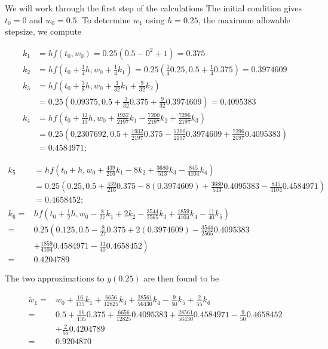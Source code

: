 \begin{mysolution}
We will work through the first step of the calculations
The initial condition gives $t_{0}=0$ and $w_{0}=0.5$. To determine $w_{1}$ using $h=0.25$, the maximum allowable stepsize, we compute

$$
\begin{aligned}
k_{1} & =h f\left(t_{0}, w_{0}\right)=0.25\left(0.5-0^{2}+1\right)=0.375 \\
k_{2} & =h f\left(t_{0}+\frac{1}{4} h, w_{0}+\frac{1}{4} k_{1}\right)=0.25\left(\frac{1}{4} 0.25,0.5+\frac{1}{4} 0.375\right)=0.3974609 \\
k_{3} & =h f\left(t_{0}+\frac{3}{8} h, w_{0}+\frac{3}{32} k_{1}+\frac{9}{32} k_{2}\right) \\
& =0.25\left(0.09375,0.5+\frac{3}{32} 0.375+\frac{9}{32} 0.3974609\right)=0.4095383 \\
k_{4} & =h f\left(t_{0}+\frac{12}{13} h, w_{0}+\frac{1932}{2197} k_{1}-\frac{7200}{2197} k_{2}+\frac{7296}{2197} k_{3}\right) \\
& =0.25\left(0.2307692,0.5+\frac{1932}{2197} 0.375-\frac{7200}{2197} 0.3974609+\frac{7296}{2197} 0.4095383\right) \\
& =0.4584971 ; 
\end{aligned}
$$

$$
\begin{aligned}
k_{5} & =h f\left(t_{0}+h, w_{0}+\frac{439}{216} k_{1}-8 k_{2}+\frac{3680}{513} k_{3}-\frac{845}{4104} k_{4}\right) \\
& =0.25\left(0.25,0.5+\frac{439}{216} 0.375-8(0.3974609)+\frac{3680}{513} 0.4095383-\frac{845}{4104} 0.4584971\right) \\
& =0.4658452 ;\\
k_{6}= & h f\left(t_{0}+\frac{1}{2} h, w_{0}-\frac{8}{27} k_{1}+2 k_{2}-\frac{3544}{2565} k_{3}+\frac{1859}{4104} k_{4}-\frac{11}{40} k_{5}\right) \\
= & 0.25\left(0.125,0.5-\frac{8}{27} 0.375+2(0.3974609)-\frac{3544}{2565} 0.4095383\right. \\
& \left.+\frac{1859}{4104} 0.4584971-\frac{11}{40} 0.4658452\right) \\
= & 0.4204789
\end{aligned}
$$

The two approximations to $y(0.25)$ are then found to be

$$
\begin{aligned}
\tilde{w}_{1}= & w_{0}+\frac{16}{135} k_{1}+\frac{6656}{12825} k_{3}+\frac{28561}{56430} k_{4}-\frac{9}{50} k_{5}+\frac{2}{55} k_{6} \\
= & 0.5+\frac{16}{135} 0.375+\frac{6656}{12825} 0.4095383+\frac{28561}{56430} 0.4584971-\frac{9}{50} 0.4658452 \\
& +\frac{2}{55} 0.4204789 \\
= & 0.9204870
\end{aligned}
$$


\end{mysolution}
